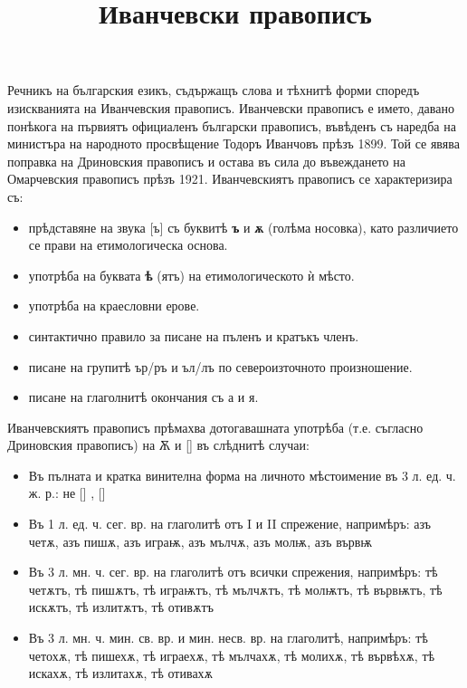 \documentclass{article}
\newcommand{\replaceLetter}[3]{%
	\StrSubstitute{#1}{#2}{#3}[\result]%
	\result
}
\renewcommand{\i}[1]{\replaceLetter{#1}{ѫ}{ѭ}}
\newcommand{\I}[1]{\replaceLetter{#1}{Ѫ}{Ѭ}}
\begin{document}
	\title{Иванчевски правописъ}
	\maketitle

	Речникъ на българския езикъ, съдържащъ слова и тѣхнитѣ форми споредъ изискванията на Иванчевския правописъ. 
	Иванчевски правописъ е името, давано понѣкога на първиятъ официаленъ български правописъ, 
	въвѣденъ съ наредба на министъра на народното просвѣщение Тодоръ Иванчовъ прѣзъ 1899.
	Той се явява поправка на Дриновския правописъ и остава въ сила до въвеждането на Омарчевския правописъ прѣзъ 1921. 
	Иванчевскиятъ правописъ се характеризира съ:
	\begin{itemize}
		\item прѣдставяне на звука [ъ] съ буквитѣ \textbf{ъ} и \textbf{ѫ} (голѣма носовка), като различието се прави на етимологическа основа. 
		\item употрѣба на буквата \textbf{ѣ} (ятъ) на етимологическото ѝ мѣсто.
		\item употрѣба на краесловни ерове.
		\item синтактично правило за писане на пъленъ и кратъкъ членъ.
		\item писане на групитѣ ър/ръ и ъл/лъ по североизточното произношение.
		\item писане на глаголнитѣ окончания съ а и я.
	\end{itemize}
	
	Иванчевскиятъ правописъ прѣмахва дотогавашната употрѣба (т.е. съгласно Дриновския правописъ) на Ѫ и \I{Ѭ}   въ слѣднитѣ случаи:
	
	\begin{itemize}
		\item Въ пълната и кратка винителна форма на личното мѣстоимение въ 3 л. ед. ч. ж. р.: не\i{ѫ}, \i{ѫ}
		
		\item Въ 1 л. ед. ч. сег. вр. на глаголитѣ отъ I и II спрежение, напримѣръ: азъ четѫ, азъ пишѫ, азъ играѭ, азъ мълчѫ, азъ молѭ, азъ вървѭ
		
		\item Въ 3 л. мн. ч. сег. вр. на глаголитѣ отъ всички спрежения, напримѣръ: тѣ четѫтъ, тѣ пишѫтъ, тѣ играѭтъ, тѣ мълчѫтъ, тѣ молѭтъ, тѣ вървѭтъ, тѣ искѫтъ, тѣ излитѫтъ, тѣ отивѫтъ
		
		\item Въ 3 л. мн. ч. мин. св. вр. и мин. несв. вр. на глаголитѣ, напримѣръ: тѣ четохѫ, тѣ пишехѫ, тѣ играехѫ, тѣ мълчахѫ, тѣ молихѫ, тѣ вървѣхѫ, тѣ искахѫ, тѣ излитахѫ, тѣ отивахѫ
	\end{itemize}
\end{document}
